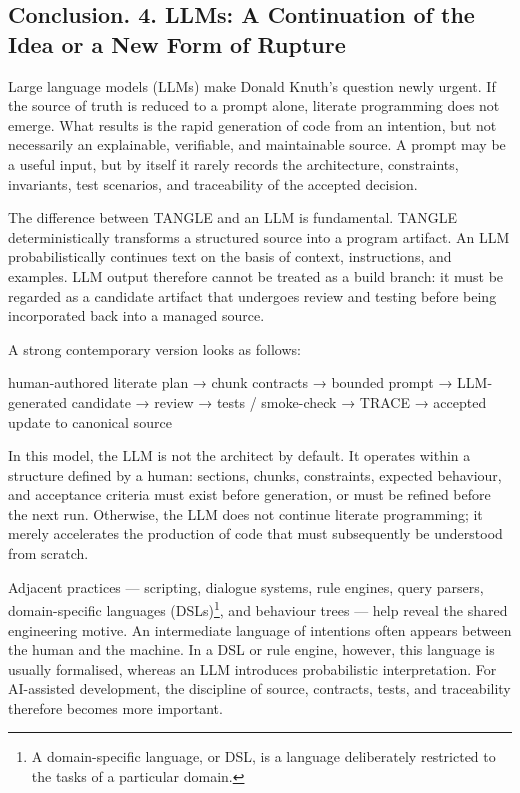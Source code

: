 \documentclass{ZGJournalArticle_2026}
\newenvironment{Shaded}{}{}
\newcommand{\NormalTok}[1]{#1}
\begin{document}
\subsection{Conclusion. 4. LLMs: A Continuation of the Idea or a New
Form of
Rupture}\label{conclusion.-4.-llms-a-continuation-of-the-idea-or-a-new-form-of-rupture}

Large language models (LLMs) make Donald Knuth's question newly urgent.
If the source of truth is reduced to a prompt alone, literate
programming does not emerge. What results is the rapid generation of
code from an intention, but not necessarily an explainable, verifiable,
and maintainable source. A prompt may be a useful input, but by itself
it rarely records the architecture, constraints, invariants, test
scenarios, and traceability of the accepted decision.

The difference between TANGLE and an LLM is fundamental. TANGLE
deterministically transforms a structured source into a program
artifact. An LLM probabilistically continues text on the basis of
context, instructions, and examples. LLM output therefore cannot be
treated as a build branch: it must be regarded as a candidate artifact
that undergoes review and testing before being incorporated back into a
managed source.

A strong contemporary version looks as follows:

\begin{Shaded}
\begin{Highlighting}[]
\NormalTok{human{-}authored literate plan}
\NormalTok{  → chunk contracts}
\NormalTok{  → bounded prompt}
\NormalTok{  → LLM{-}generated candidate}
\NormalTok{  → review}
\NormalTok{  → tests / smoke{-}check}
\NormalTok{  → TRACE}
\NormalTok{  → accepted update to canonical source}
\end{Highlighting}
\end{Shaded}

In this model, the LLM is not the architect by default. It operates
within a structure defined by a human: sections, chunks, constraints,
expected behaviour, and acceptance criteria must exist before
generation, or must be refined before the next run. Otherwise, the LLM
does not continue literate programming; it merely accelerates the
production of code that must subsequently be understood from scratch.

Adjacent practices --- scripting, dialogue systems, rule engines, query
parsers, domain-specific languages (DSLs)\footnote{A domain-specific
  language, or DSL, is a language deliberately restricted to the tasks
  of a particular domain.}, and behaviour trees --- help reveal the
shared engineering motive. An intermediate language of intentions often
appears between the human and the machine. In a DSL or rule engine,
however, this language is usually formalised, whereas an LLM introduces
probabilistic interpretation. For AI-assisted development, the
discipline of source, contracts, tests, and traceability therefore
becomes more important.
\end{document}

